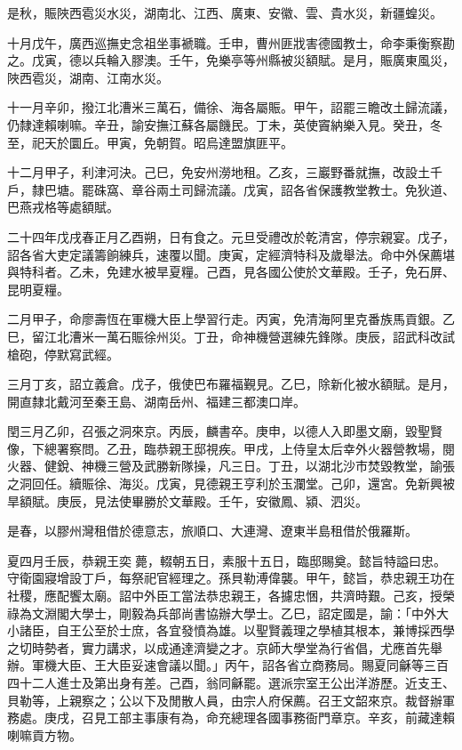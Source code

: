 \begin{pinyinscope}
是秋，賑陜西雹災水災，湖南北、江西、廣東、安徽、雲、貴水災，新疆蝗災。

十月戊午，廣西巡撫史念祖坐事褫職。壬申，曹州匪戕害德國教士，命李秉衡察勘之。戊寅，德以兵輪入膠澳。壬午，免樂亭等州縣被災額賦。是月，賑廣東風災，陜西雹災，湖南、江南水災。

十一月辛卯，撥江北漕米三萬石，備徐、海各屬賑。甲午，詔罷三瞻改土歸流議，仍隸達賴喇嘛。辛丑，諭安撫江蘇各屬饑民。丁未，英使竇納樂入見。癸丑，冬至，祀天於圜丘。甲寅，免朝賀。昭烏達盟旗匪平。

十二月甲子，利津河決。己巳，免安州澇地租。乙亥，三巖野番就撫，改設土千戶，隸巴塘。罷硃窩、章谷兩土司歸流議。戊寅，詔各省保護教堂教士。免狄道、巴燕戎格等處額賦。

二十四年戊戌春正月乙酉朔，日有食之。元旦受禮改於乾清宮，停宗親宴。戊子，詔各省大吏定議籌餉練兵，速覆以聞。庚寅，定經濟特科及歲舉法。命中外保薦堪與特科者。乙未，免建水被旱夏糧。己酉，見各國公使於文華殿。壬子，免石屏、昆明夏糧。

二月甲子，命廖壽恆在軍機大臣上學習行走。丙寅，免清海阿里克番族馬貢銀。乙巳，留江北漕米一萬石賑徐州災。丁丑，命神機營選練先鋒隊。庚辰，詔武科改試槍砲，停默寫武經。

三月丁亥，詔立義倉。戊子，俄使巴布羅福覲見。乙巳，除新化被水額賦。是月，開直隸北戴河至秦王島、湖南岳州、福建三都澳口岸。

閏三月乙卯，召張之洞來京。丙辰，麟書卒。庚申，以德人入即墨文廟，毀聖賢像，下總署察問。乙丑，臨恭親王邸視疾。甲戌，上侍皇太后幸外火器營教場，閱火器、健銳、神機三營及武勝新隊操，凡三日。丁丑，以湖北沙市焚毀教堂，諭張之洞回任。續賑徐、海災。戊寅，見德親王亨利於玉瀾堂。己卯，還宮。免新興被旱額賦。庚辰，見法使畢勝於文華殿。壬午，安徽鳳、潁、泗災。

是春，以膠州灣租借於德意志，旅順口、大連灣、遼東半島租借於俄羅斯。

夏四月壬辰，恭親王奕薨，輟朝五日，素服十五日，臨邸賜奠。懿旨特謚曰忠。守衛園寢增設丁戶，每祭祀官經理之。孫貝勒溥偉襲。甲午，懿旨，恭忠親王功在社稷，應配饗太廟。詔中外臣工當法恭忠親王，各攄忠悃，共濟時艱。己亥，授榮祿為文淵閣大學士，剛毅為兵部尚書協辦大學士。乙巳，詔定國是，諭：「中外大小諸臣，自王公至於士庶，各宜發憤為雄。以聖賢義理之學植其根本，兼博採西學之切時勢者，實力講求，以成通達濟變之才。京師大學堂為行省倡，尤應首先舉辦。軍機大臣、王大臣妥速會議以聞。」丙午，詔各省立商務局。賜夏同龢等三百四十二人進士及第出身有差。己酉，翁同龢罷。選派宗室王公出洋游歷。近支王、貝勒等，上親察之；公以下及閒散人員，由宗人府保薦。召王文韶來京。裁督辦軍務處。庚戌，召見工部主事康有為，命充總理各國事務衙門章京。辛亥，前藏達賴喇嘛貢方物。


\end{pinyinscope}
